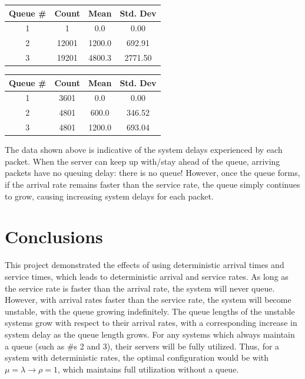 \documentclass{article}
\begin{document}
\begin{minipage}{0.5\textwidth}
	\centering
	\begin{tabular}{|c|c|c|c|} \hline
		\textbf{Queue \#} & \textbf{Count} & \textbf{Mean} & \textbf{Std. Dev} \\ \hline
		1 & 1 & 0.0 & 0.00 \\ \hline
		2 & 12001 & 1200.0 & 692.91 \\ \hline
		3 & 19201 & 4800.3 & 2771.50 \\ \hline
	\end{tabular}
	\label{qlen}
\end{minipage}  
\begin{minipage}{0.5\textwidth}
	\centering
	\begin{tabular}{|c|c|c|c|} \hline
		\textbf{Queue \#} & \textbf{Count} & \textbf{Mean} & \textbf{Std. Dev} \\ \hline
		1 & 3601 & 0.0 & 0.00 \\ \hline
		2 & 4801 & 600.0 & 346.52 \\ \hline
		3 & 4801 & 1200.0 & 693.04 \\ \hline
	\end{tabular}
	\label{qTime}
\end{minipage}
\vspace{.25cm}

The data shown above is indicative of the system delays experienced by each packet.
When the server can keep up with/stay ahead of the queue, arriving packets have no queuing delay:  there is no queue!
However, once the queue forms, if the arrival rate remains faster than the service rate, the queue simply continues to grow, causing increasing system delays for each packet.

\section*{Conclusions}
This project demonstrated the effects of using deterministic arrival times and service times, which leads to deterministic arrival and service rates.
As long as the service rate is faster than the arrival rate, the system will never queue.
However, with arrival rates faster than the service rate, the system will become unstable, with the queue growing indefinitely.
The queue lengths of the unstable systems grow with respect to their arrival rates, with a corresponding increase in system delay as the queue length grows.
For any systems which always maintain a queue (such as \#s 2 and 3), their servers will be fully utilized.
Thus, for a system with deterministic rates, the optimal configuration would be with $\mu = \lambda \rightarrow \rho = 1$, which maintains full utilization without a queue.
\newpage
\end{document}
